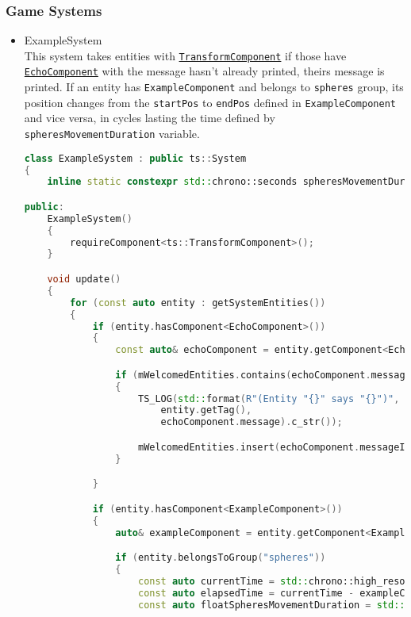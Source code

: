 \subsubsection{Game Systems}
\begin{itemize}
    \item ExampleSystem\\
    \label{example_system}
    This system takes entities with \hyperref[transform_component]{\texttt{TransformComponent}} if those have \hyperref[echo_component]{\texttt{EchoComponent}} with the message hasn't already printed, theirs message is printed. If an entity has \texttt{ExampleComponent} and belongs to \texttt{spheres} group, its position changes from the \texttt{startPos} to \texttt{endPos} defined in \texttt{ExampleComponent} and vice versa, in cycles lasting the time defined by \texttt{spheresMovementDuration} variable.
\begin{lstlisting}[language=c++, caption=Example system (./game/systems/example\_system.hpp)]
class ExampleSystem : public ts::System
{
    inline static constexpr std::chrono::seconds spheresMovementDuration{2s};

public:
    ExampleSystem()
    {
        requireComponent<ts::TransformComponent>();
    }

    void update()
    {
        for (const auto entity : getSystemEntities())
        {
            if (entity.hasComponent<EchoComponent>())
            {
                const auto& echoComponent = entity.getComponent<EchoComponent>();

                if (mWelcomedEntities.contains(echoComponent.messageId))
                {
                    TS_LOG(std::format(R"(Entity "{}" says "{}")",
                        entity.getTag(),
                        echoComponent.message).c_str());

                    mWelcomedEntities.insert(echoComponent.messageId);
                }

            }

            if (entity.hasComponent<ExampleComponent>())
            {
                auto& exampleComponent = entity.getComponent<ExampleComponent>();

                if (entity.belongsToGroup("spheres"))
                {
                    const auto currentTime = std::chrono::high_resolution_clock::now();
                    const auto elapsedTime = currentTime - exampleComponent.startTime;
                    const auto floatSpheresMovementDuration = std::chrono::duration<float>(spheresMovementDuration);


\end{lstlisting}
\end{itemize}
